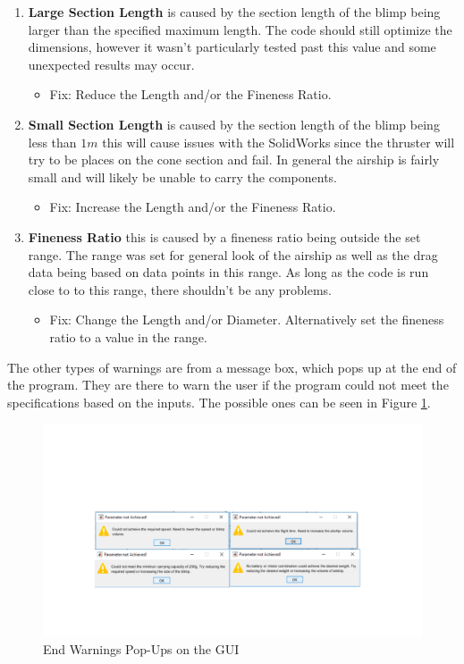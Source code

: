 \documentclass[../main.tex]{subfiles}
\begin{document}
\begin{enumerate}
	\item \textbf{Large Section Length} is caused by the section length of the blimp being larger than the specified maximum length. The code should still optimize the dimensions, however it wasn't particularly tested past this value and some unexpected results may occur.
	\begin{itemize}
		\item Fix: Reduce the Length and/or the Fineness Ratio.
	\end{itemize}
	\item \textbf{Small Section Length} is caused by the section length of the blimp being less than $1m$ this will cause issues with the SolidWorks since the thruster will try to be places on the cone section and fail. In general the airship is fairly small and will likely be unable to carry the components.
	\begin{itemize}
		\item Fix: Increase the Length and/or the Fineness Ratio.
	\end{itemize} 
	\item \textbf{Fineness Ratio} this is caused by a fineness ratio being outside the set range. The range was set for general look of the airship as well as the drag data being based on data points in this range. As long as the code is run close to to this range, there shouldn't be any problems.
	\begin{itemize}
		\item Fix: Change the Length and/or Diameter. Alternatively set the fineness ratio to a value in the range.
	\end{itemize} 
\end{enumerate}

The other types of warnings are from a message box, which pops up at the end of the program. They are there to warn the user if the program could not meet the specifications based on the inputs. The possible ones can be seen in Figure \ref{fig:popupWarnings}.

\begin{figure}[H]
	\centering
	\includegraphics[width=0.9\linewidth]{img/gui/warnings.pdf}
	\caption{End Warnings Pop-Ups on the GUI}
	\label{fig:popupWarnings}
\end{figure}
\end{document}
